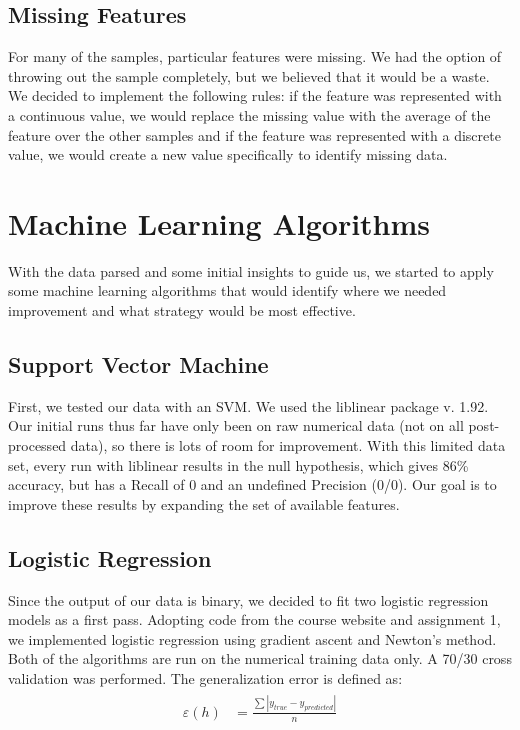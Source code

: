 \documentclass[paper=letter, fontsize=11pt]{scrartcl} %
\numberwithin{equation}{section} %
\begin{document}
\subsection{Missing Features}
	For many of the samples, particular features were missing. We had the option of throwing out the sample completely, but we believed that it would be a waste. We decided to implement the following rules: if the feature was represented with a continuous value, we would replace the missing value with the average of the feature over the other samples and if the feature was represented with a discrete value, we would create a new value specifically to identify missing data.

\section{Machine Learning Algorithms}
	With the data parsed and some initial insights to guide us, we started to apply some machine learning algorithms that would identify where we needed improvement and what strategy would be most effective.

\subsection{Support Vector Machine}
	First, we tested our data with an SVM. We used the liblinear package v. 1.92. Our initial runs thus far have only been on raw numerical data (not on all post-processed data), so there is lots of room for improvement. With this limited data set, every run with liblinear results in the null hypothesis, which gives 86\% accuracy, but has a Recall of 0 and an undefined Precision (0/0). Our goal is to improve these results by expanding the set of available features.

\subsection{Logistic Regression}
	Since the output of our data is binary, we decided to fit two logistic regression models as a first pass. Adopting code from the course website and assignment 1, we implemented logistic regression using gradient ascent and Newton's method. Both of the algorithms are run on the numerical training data only. A 70/30 cross validation was performed. The generalization error is defined as:
\begin{align} 
	\begin{split}
		\varepsilon(h) &= \frac{\sum|y_{true} - y_{predicted}|}{n} \\
	\end{split}					
\end{align}
\end{document}
